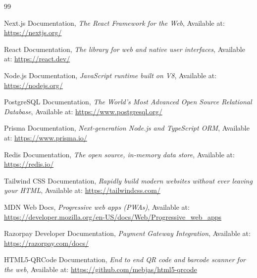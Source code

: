 \documentclass[12pt,a4paper]{report}
\begin{document}
\begin{thebibliography}{99}

Next.js Documentation, \textit{The React Framework for the Web},  
Available at: \url{https://nextjs.org/}

React Documentation, \textit{The library for web and native user interfaces},  
Available at: \url{https://react.dev/}

Node.js Documentation, \textit{JavaScript runtime built on V8},  
Available at: \url{https://nodejs.org/}

PostgreSQL Documentation, \textit{The World's Most Advanced Open Source Relational Database},  
Available at: \url{https://www.postgresql.org/}

Prisma Documentation, \textit{Next-generation Node.js and TypeScript ORM},  
Available at: \url{https://www.prisma.io/}

Redis Documentation, \textit{The open source, in-memory data store},  
Available at: \url{https://redis.io/}

Tailwind CSS Documentation, \textit{Rapidly build modern websites without ever leaving your HTML},  
Available at: \url{https://tailwindcss.com/}

MDN Web Docs, \textit{Progressive web apps (PWAs)},  
Available at: \url{https://developer.mozilla.org/en-US/docs/Web/Progressive_web_apps}

Razorpay Developer Documentation, \textit{Payment Gateway Integration},  
Available at: \url{https://razorpay.com/docs/}

HTML5-QRCode Documentation, \textit{End to end QR code and barcode scanner for the web},  
Available at: \url{https://github.com/mebjas/html5-qrcode}

\end{thebibliography}
\end{document}
